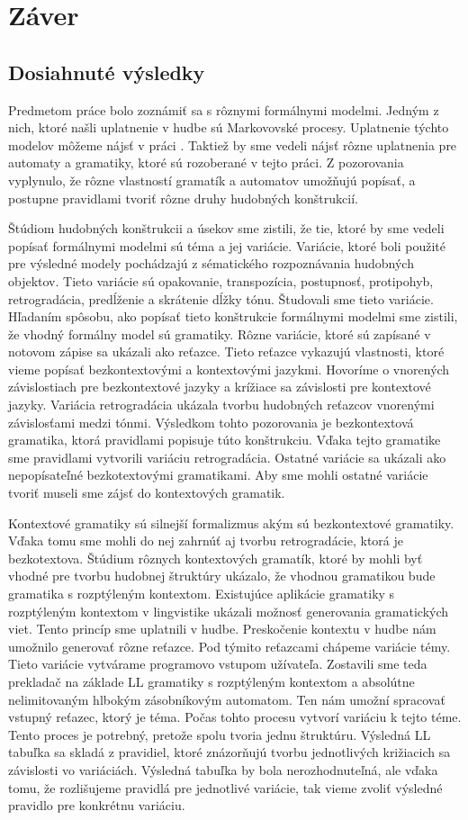 \chapter{Záver}
\label{chap:end}
\section{Dosiahnuté výsledky}
Predmetom práce bolo zoznámiť sa s rôznymi formálnymi modelmi. Jedným z nich, ktoré našli uplatnenie v hudbe sú Markovovské procesy. Uplatnenie týchto modelov môžeme nájsť v práci \cite{afrpub}. Taktiež by sme vedeli nájsť rôzne uplatnenia pre automaty a gramatiky, ktoré sú rozoberané v tejto práci. Z pozorovania vyplynulo, že rôzne vlastností gramatík a automatov umožňujú popísať, a postupne pravidlami tvoriť rôzne druhy hudobných konštrukcií.

Štúdiom hudobných konštrukcii a úsekov sme zistili, že tie, ktoré by sme vedeli popísať formálnymi modelmi sú téma a jej variácie. Variácie, ktoré boli použité pre výsledné modely pochádzajú z sématického rozpoznávania hudobných objektov. Tieto variácie sú opakovanie, transpozícia, postupnosť, protipohyb, retrogradácia, predĺženie a skrátenie dĺžky tónu. Študovali sme tieto variácie. Hľadaním spôsobu, ako popísať tieto konštrukcie formálnymi modelmi sme zistili, že vhodný formálny model sú gramatiky. Rôzne variácie, ktoré sú zapísané v notovom zápise sa ukázali ako reťazce. Tieto reťazce vykazujú vlastnosti, ktoré vieme popísať bezkontextovými a kontextovými jazykmi. Hovoríme o vnorených závislostiach pre bezkontextové jazyky a krížiace sa závislosti pre kontextové jazyky. Variácia retrogradácia ukázala tvorbu hudobných reťazcov vnorenými závislosťami medzi tónmi. Výsledkom tohto pozorovania je bezkontextová gramatika, ktorá pravidlami popisuje túto konštrukciu. Vďaka tejto gramatike sme pravidlami vytvorili variáciu retrogradácia. Ostatné variácie sa ukázali ako nepopísateľné bezkotextovými gramatikami. Aby sme mohli ostatné variácie tvoriť museli sme zájsť do kontextových gramatik.

Kontextové gramatiky sú silnejší formalizmus akým sú bezkontextové gramatiky. Vďaka tomu sme mohli do nej zahrnúť aj tvorbu retrogradácie, ktorá je bezkotextova. Štúdium rôznych kontextových gramatík, ktoré by mohli byť vhodné pre tvorbu hudobnej štruktúry ukázalo, že vhodnou gramatikou bude gramatika s rozptýleným kontextom. Existujúce aplikácie gramatiky s rozptýleným kontextom v lingvistike ukázali možnosť generovania gramatických viet. Tento princíp sme uplatnili v hudbe. Preskočenie kontextu v hudbe nám umožnilo generovať rôzne reťazce. Pod týmito reťazcami chápeme variácie témy. Tieto variácie vytvárame programovo vstupom užívateľa. Zostavili sme teda prekladač na základe LL gramatiky s rozptýleným kontextom a absolútne nelimitovaným hlbokým zásobníkovým automatom. Ten nám umožní spracovať vstupný reťazec, ktorý je téma. Počas tohto procesu vytvorí variáciu k tejto téme. Tento proces je potrebný, pretože spolu tvoria jednu štruktúru. Výsledná LL tabuľka sa skladá z pravidiel, ktoré znázorňujú tvorbu jednotlivých križiacich sa závislosti vo variáciách. Výsledná tabuľka by bola nerozhodnuteľná, ale vďaka tomu, že rozlišujeme pravidlá pre jednotlivé variácie, tak vieme zvoliť výsledné pravidlo pre konkrétnu variáciu.

